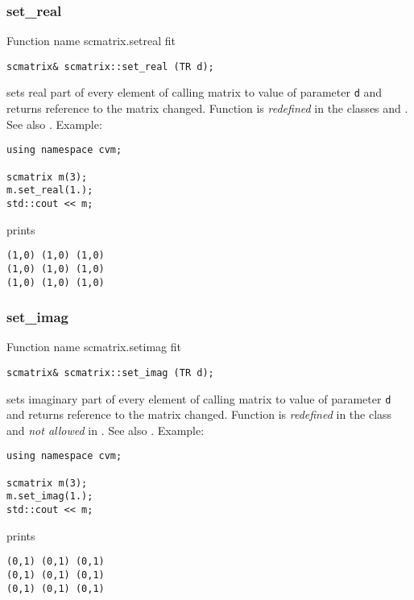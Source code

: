 \subsubsection{set\_real}
Function%
\pdfdest name {scmatrix.setreal} fit
\begin{verbatim}
scmatrix& scmatrix::set_real (TR d);
\end{verbatim}
sets real part of every element of  calling matrix to  value of
parameter \verb"d"
and returns  reference to the matrix changed.
Function is \emph{redefined} in the classes
and .
See also .
Example:
\begin{Verbatim}
using namespace cvm;

scmatrix m(3);
m.set_real(1.);
std::cout << m;
\end{Verbatim}
prints
\begin{Verbatim}
(1,0) (1,0) (1,0)
(1,0) (1,0) (1,0)
(1,0) (1,0) (1,0)
\end{Verbatim}
\newpage





\subsubsection{set\_imag}
Function%
\pdfdest name {scmatrix.setimag} fit
\begin{verbatim}
scmatrix& scmatrix::set_imag (TR d);
\end{verbatim}
sets imaginary part of every element of  calling matrix to  value of
parameter \verb"d"
and returns  reference to the matrix changed.
Function is \emph{redefined} in the class
and \emph{not allowed} in .
See also .
Example:
\begin{Verbatim}
using namespace cvm;

scmatrix m(3);
m.set_imag(1.);
std::cout << m;
\end{Verbatim}
prints
\begin{Verbatim}
(0,1) (0,1) (0,1)
(0,1) (0,1) (0,1)
(0,1) (0,1) (0,1)
\end{Verbatim}
\newpage




